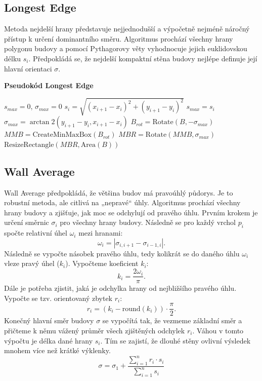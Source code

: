 \subsection{Longest Edge}

Metoda nejdelší hrany představuje nejjednodušší a výpočetně nejméně náročný přístup k určení dominantního směru. Algoritmus prochází všechny hrany polygonu budovy a pomocí Pythagorovy věty vyhodnocuje jejich euklidovskou délku $s_i$. Předpokládá se, že nejdelší kompaktní stěna budovy nejlépe definuje její hlavní orientaci $\sigma$.

\textbf{Pseudokód Longest Edge}
\begin{algorithm}[H]
\caption{Longest Edge ($B$)}
\label{alg:longestedge}
\begin{algorithmic}[1]
\State $s_{max} = 0$, $\sigma_{max} = 0$
    \State $s_i = \sqrt{(x_{i+1} - x_i)^2 + (y_{i+1} - y_i)^2}$
        \State $s_{max} = s_i$
        \State $\sigma_{max} = \arctan2(y_{i+1} - y_i, x_{i+1} - x_i)$
    \EndIf
\EndFor
\State $B_{rot} = \text{Rotate}(B, -\sigma_{max})$
\State $MMB = \text{CreateMinMaxBox}(B_{rot})$
\State $MBR = \text{Rotate}(MMB, \sigma_{max})$
\State \Return $\text{ResizeRectangle}(MBR, \text{Area}(B))$
\end{algorithmic}
\end{algorithm}




\subsection{Wall Average}
Wall Average předpokládá, že většina budov má pravoúhlý půdorys. Je to robustní metoda, ale citlivá na „nepravé“ úhly.
Algoritmus prochází všechny hrany budovy a zjišťuje, jak moc se odchylují od pravého úhlu.
Prvním krokem je určení směrnic $\sigma_i$ pro všechny hrany budovy. Následně se pro každý vrchol $p_i$ spočte relativní úhel $\omega_i$ mezi hranami: 
\[
\omega_i= | \sigma_{i, i+1} - \sigma_{i-1, i}|.
\]
Následně se vypočte násobek pravého úhlu, tedy kolikrát se do daného úhlu $\omega_i$ vleze pravý úhel ($k_i$).
Vypočteme koeficient $k_i$:
\[
k_i = \frac{2\omega_i}{\pi}.
\]
Dále je potřeba zjistit, jaká je odchylka hrany od nejbližšího pravého úhlu. Vypočte se tzv. orientovaný zbytek $r_i$:
\[
r_i = (k_i -\text{round}(k_i))\cdot\frac{\pi}{2}.
\]
Konečný hlavní směr budovy $\sigma$ se vypočítá tak, že vezmeme základní směr a přičteme k němu vážený průměr všech zjištěných odchylek $r_i$. Váhou v tomto výpočtu je délka dané hrany $s_i$. Tím se zajistí, že dlouhé stěny ovlivní výsledek mnohem více než krátké výklenky.
\[
\sigma = \sigma_{1} + \frac{\sum^n_{i=1} r_i\cdot s_i}{\sum^n_{i=1} s_i}
\]

